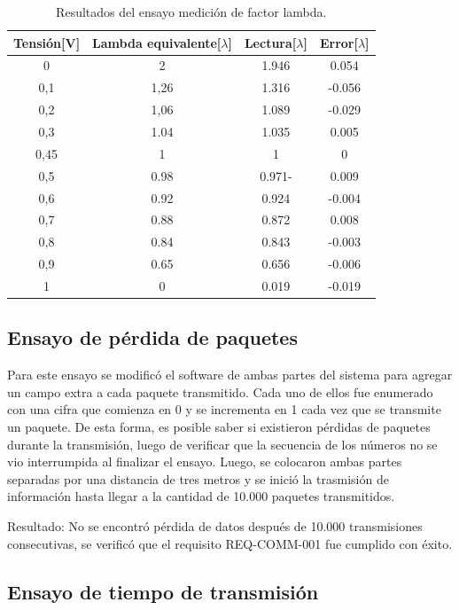 \begin{table}[htpb]
	\centering
	\caption{Resultados del ensayo medición de factor lambda.}
	\centering
	\begin{tabular}{c c c c}    
		\toprule
		\textbf{Tensión[V]} & \textbf{Lambda equivalente[$\lambda$]} & \textbf{Lectura[$\lambda$]} & \textbf{Error[$\lambda$]} \\
		\midrule
		0		&	2	 & 1.946 & 0.054 \\		
		0,1		&   1,26 & 1.316 & -0.056 \\
		0,2		&   1,06 & 1.089 & -0.029 \\
		0,3		&   1.04 & 1.035 & 0.005 \\
		0,45	&   1 	 & 1 	 & 0 \\
		0,5		&   0.98 & 0.971- & 0.009 \\
		0,6		&   0.92 & 0.924 & -0.004 \\
		0,7		&   0.88 & 0.872 & 0.008 \\
		0,8		&   0.84 & 0.843 & -0.003 \\
		0,9		&   0.65 & 0.656 & -0.006 \\
		1		&   0	 & 0.019 & -0.019 \\
		\bottomrule
	\end{tabular}
	\label{tab:ensayo-o2}
\end{table}

\subsection{Ensayo de pérdida de paquetes}

Para este ensayo se modificó el software de ambas partes del sistema para agregar un campo extra a cada paquete transmitido. Cada uno de ellos fue enumerado con una cifra que comienza en 0 y se incrementa en 1 cada vez que se transmite un paquete. De esta forma, es posible saber si existieron pérdidas de paquetes durante la transmisión, luego de verificar que la secuencia de los números no se vio interrumpida al finalizar el ensayo. Luego, se colocaron ambas partes separadas por una distancia de tres metros y se inició la trasmisión de información hasta llegar a la cantidad de 10.000 paquetes transmitidos.

Resultado: No se encontró pérdida de datos después de 10.000 transmisiones consecutivas, se verificó que el requisito REQ-COMM-001 fue cumplido con éxito.

\subsection{Ensayo de tiempo de transmisión}

